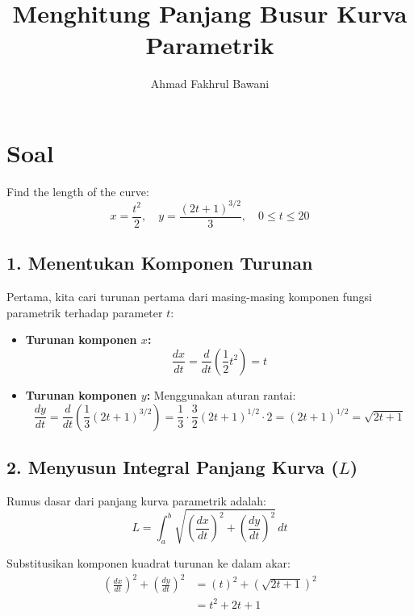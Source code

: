 \documentclass[12pt,a4paper]{article}
\title{Menghitung Panjang Busur Kurva Parametrik}
\author{Ahmad Fakhrul Bawani}
\date{}
\begin{document}
\maketitle

\section*{Soal}

Find the length of the curve:
\begin{equation*}
  x = \frac{t^2}{2}, \quad y = \frac{(2t + 1)^{3/2}}{3}, \quad 0 \le t \le 20
\end{equation*}

\subsection*{1. Menentukan Komponen Turunan}
Pertama, kita cari turunan pertama dari masing-masing komponen fungsi parametrik terhadap parameter $t$:
\begin{itemize}
  \item \textbf{Turunan komponen $x$:}
    \begin{equation*}
      \frac{dx}{dt} = \frac{d}{dt}\left(\frac{1}{2}t^2\right) = t
    \end{equation*}
  \item \textbf{Turunan komponen $y$:}
    Menggunakan aturan rantai:
    \begin{equation*}
      \frac{dy}{dt} = \frac{d}{dt}\left(\frac{1}{3}(2t + 1)^{3/2}\right) = \frac{1}{3} \cdot \frac{3}{2}(2t + 1)^{1/2} \cdot 2 = (2t + 1)^{1/2} = \sqrt{2t + 1}
    \end{equation*}
\end{itemize}

\subsection*{2. Menyusun Integral Panjang Kurva ($L$)}
Rumus dasar dari panjang kurva parametrik adalah:
\begin{equation*}
  L = \int_{a}^{b} \sqrt{\left(\frac{dx}{dt}\right)^2 + \left(\frac{dy}{dt}\right)^2} \, dt
\end{equation*}

Substitusikan komponen kuadrat turunan ke dalam akar:
\begin{align*}
  \left(\frac{dx}{dt}\right)^2 + \left(\frac{dy}{dt}\right)^2 &= (t)^2 + \left(\sqrt{2t + 1}\right)^2 \\
  &= t^2 + 2t + 1
\end{align*}
\end{document}
